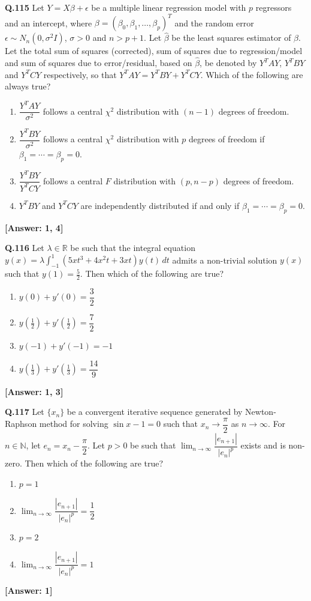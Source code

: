 \documentclass[12pt,a4paper]{article}
\newcommand{\ans}[1]{\quad\textcolor{anscolor}{\textbf{[Answer: #1]}}}
\begin{document}
\textbf{Q.115} Let $Y=X\beta+\epsilon$ be a multiple linear regression model with $p$ regressors and an intercept, where $\beta=(\beta_0,\beta_1,\ldots,\beta_p)^T$ and the random error $\epsilon\sim N_n(0,\sigma^2I)$, $\sigma>0$ and $n>p+1$. Let $\hat{\beta}$ be the least squares estimator of $\beta$. Let the total sum of squares (corrected), sum of squares due to regression/model and sum of squares due to error/residual, based on $\hat{\beta}$, be denoted by $Y^TAY$, $Y^TBY$ and $Y^TCY$ respectively, so that $Y^TAY=Y^TBY+Y^TCY$. Which of the following are always true?
\begin{enumerate}[label=\arabic*.]
\item $\dfrac{Y^TAY}{\sigma^2}$ follows a central $\chi^2$ distribution with $(n-1)$ degrees of freedom.
\item $\dfrac{Y^TBY}{\sigma^2}$ follows a central $\chi^2$ distribution with $p$ degrees of freedom if $\beta_1=\cdots=\beta_p=0$.
\item $\dfrac{Y^TBY}{Y^TCY}$ follows a central $F$ distribution with $(p,n-p)$ degrees of freedom.
\item $Y^TBY$ and $Y^TCY$ are independently distributed if and only if $\beta_1=\cdots=\beta_p=0$.
\end{enumerate}\ans{1, 4}

\textbf{Q.116} Let $\lambda\in\mathbb{R}$ be such that the integral equation $y(x)=\lambda\int_{-1}^1(5xt^3+4x^2t+3xt)y(t)\,dt$ admits a non-trivial solution $y(x)$ such that $y(1)=\tfrac{5}{2}$. Then which of the following are true?
\begin{enumerate}[label=\arabic*.]
\item $y(0)+y'(0)=\dfrac{3}{2}$
\item $y\!\left(\tfrac{1}{2}\right)+y'\!\left(\tfrac{1}{2}\right)=\dfrac{7}{2}$
\item $y(-1)+y'(-1)=-1$
\item $y\!\left(\tfrac{1}{3}\right)+y'\!\left(\tfrac{1}{3}\right)=\dfrac{14}{9}$
\end{enumerate}\ans{1, 3}

\textbf{Q.117} Let $\{x_n\}$ be a convergent iterative sequence generated by Newton-Raphson method for solving $\sin x-1=0$ such that $x_n\to\dfrac{\pi}{2}$ as $n\to\infty$. For $n\in\mathbb{N}$, let $e_n=x_n-\dfrac{\pi}{2}$. Let $p>0$ be such that $\lim_{n\to\infty}\dfrac{|e_{n+1}|}{|e_n|^p}$ exists and is non-zero. Then which of the following are true?
\begin{enumerate}[label=\arabic*.]
\item $p=1$ \item $\lim_{n\to\infty}\dfrac{|e_{n+1}|}{|e_n|^p}=\dfrac{1}{2}$
\item $p=2$ \item $\lim_{n\to\infty}\dfrac{|e_{n+1}|}{|e_n|^p}=1$
\end{enumerate}\ans{1}
\end{document}
